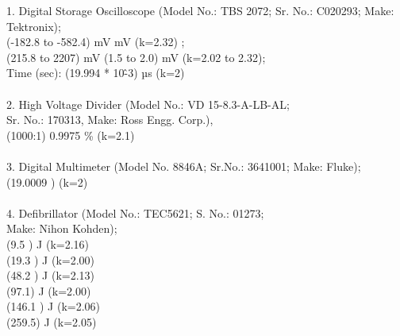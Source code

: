 1. Digital Storage Oscilloscope (Model No.: TBS 2072; Sr. No.: C020293; Make: Tektronix);  \\
(-182.8 to -582.4) mV  mV (k=2.32) ;  \\
(215.8 to 2207) mV \textpm (1.5 to 2.0) mV (k=2.02 to 2.32);  \\
Time (sec): (19.994  * 10\^-3) µs (k=2) \\
 \\
2. High Voltage Divider (Model No.: VD 15-8.3-A-LB-AL; \\
Sr. No.: 170313, Make: Ross Engg. Corp.), \\
(1000:1) 0.9975 \% (k=2.1) \\
 \\
3. Digital Multimeter (Model No. 8846A; Sr.No.: 3641001; Make: Fluke); \\
(19.0009 ) \textohm (k=2) \\
 \\
4. Defibrillator (Model No.: TEC5621; S. No.: 01273; \\
Make: Nihon Kohden); \\
(9.5 ) J (k=2.16) \\
(19.3 ) J (k=2.00) \\
(48.2 ) J (k=2.13) \\
(97.1) J (k=2.00) \\
(146.1 ) J (k=2.06) \\
(259.5) J (k=2.05)